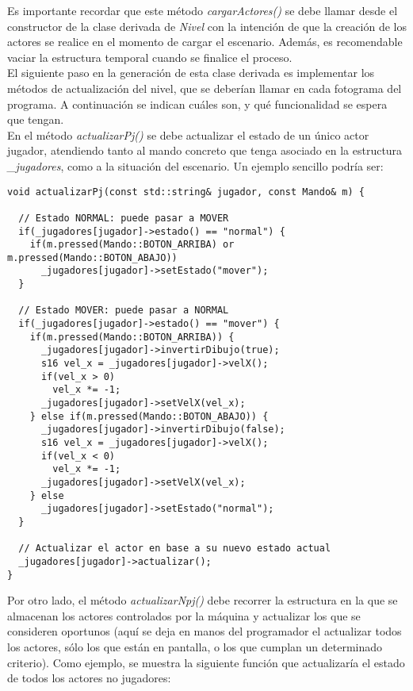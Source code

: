 Es importante recordar que este método \emph{cargarActores()} se debe llamar desde el constructor de la clase derivada de \emph{Nivel} con la intención de que la creación de los actores se realice en el momento de cargar el escenario. Además, es recomendable vaciar la estructura temporal cuando se finalice el proceso.\\

El siguiente paso en la generación de esta clase derivada es implementar los métodos de actualización del nivel, que se deberían llamar en cada fotograma del programa. A continuación se indican cuáles son, y qué funcionalidad se espera que tengan.\\

En el método \emph{actualizarPj()} se debe actualizar el estado de un único actor jugador, atendiendo tanto al mando concreto que tenga asociado en la estructura \emph{\_jugadores}, como a la situación del escenario. Un ejemplo sencillo podría ser:

\begin{lstlisting}[style=C++]
void actualizarPj(const std::string& jugador, const Mando& m) {

  // Estado NORMAL: puede pasar a MOVER
  if(_jugadores[jugador]->estado() == "normal") {
    if(m.pressed(Mando::BOTON_ARRIBA) or m.pressed(Mando::BOTON_ABAJO))
      _jugadores[jugador]->setEstado("mover");
  }

  // Estado MOVER: puede pasar a NORMAL
  if(_jugadores[jugador]->estado() == "mover") {
    if(m.pressed(Mando::BOTON_ARRIBA)) {
      _jugadores[jugador]->invertirDibujo(true);
      s16 vel_x = _jugadores[jugador]->velX();
      if(vel_x > 0)
        vel_x *= -1;
      _jugadores[jugador]->setVelX(vel_x);
    } else if(m.pressed(Mando::BOTON_ABAJO)) {
      _jugadores[jugador]->invertirDibujo(false);
      s16 vel_x = _jugadores[jugador]->velX();
      if(vel_x < 0)
        vel_x *= -1;
      _jugadores[jugador]->setVelX(vel_x);
    } else
      _jugadores[jugador]->setEstado("normal");
  }

  // Actualizar el actor en base a su nuevo estado actual
  _jugadores[jugador]->actualizar();
}
\end{lstlisting}

Por otro lado, el método \emph{actualizarNpj()} debe recorrer la estructura en la que se almacenan los actores controlados por la máquina y actualizar los que se consideren oportunos (aquí se deja en manos del programador el actualizar todos los actores, sólo los que están en pantalla, o los que cumplan un determinado criterio). Como ejemplo, se muestra la siguiente función que actualizaría el estado de todos los actores no jugadores:


